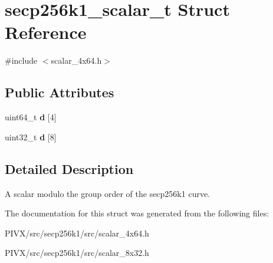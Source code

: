 \hypertarget{structsecp256k1__scalar__t}{}\section{secp256k1\+\_\+scalar\+\_\+t Struct Reference}
\label{structsecp256k1__scalar__t}


{\ttfamily \#include $<$scalar\+\_\+4x64.\+h$>$}

\subsection*{Public Attributes}
\begin{DoxyCompactItemize}
\item 
\mbox{\label{structsecp256k1__scalar__t_a23fa40eb564d5b22bacef121ca08989e}} 
uint64\+\_\+t {\bfseries d} \mbox{[}4\mbox{]}
\item 
\mbox{\label{structsecp256k1__scalar__t_a8d15cbf4135058b534c31f2cef6c1123}} 
uint32\+\_\+t {\bfseries d} \mbox{[}8\mbox{]}
\end{DoxyCompactItemize}


\subsection{Detailed Description}
A scalar modulo the group order of the secp256k1 curve. 

The documentation for this struct was generated from the following files\+:\begin{DoxyCompactItemize}
\item 
P\+I\+V\+X/src/secp256k1/src/scalar\+\_\+4x64.\+h\item 
P\+I\+V\+X/src/secp256k1/src/scalar\+\_\+8x32.\+h\end{DoxyCompactItemize}
